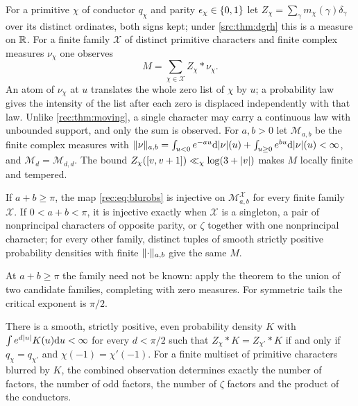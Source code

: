 For a primitive $\chi$ of conductor $q_\chi$ and parity $\epsilon_\chi\in\{0,1\}$ let $Z_\chi=\sum_\gamma m_\chi(\gamma)\delta_\gamma$ over its distinct
ordinates, both signs kept; under \cref{src:thm:dgrh} this is a measure on $\mathbb{R}$. For a finite family $\mathcal X$ of
distinct primitive characters and finite complex measures $\nu_\chi$ one observes
\begin{equation}\label{rec:eq:blurobs}
 M=\sum_{\chi\in\mathcal X}Z_\chi*\nu_\chi .
\end{equation}
An atom of $\nu_\chi$ at $u$ translates the whole zero list of $\chi$ by $u$; a probability law gives the intensity of the
list after each zero is displaced independently with that law. Unlike \cref{rec:thm:moving}, a single
character may carry a continuous law with unbounded support, and only the sum is observed. For $a,b>0$ let
$\mathcal M_{a,b}$ be the finite complex measures with
$\lVert\nu\rVert_{a,b}=\int_{u<0}e^{-au}\mathrm{d}\lvert\nu\rvert(u)+\int_{u\ge0}e^{bu}\mathrm{d}\lvert\nu\rvert(u)<\infty$, and $\mathcal M_d=\mathcal M_{d,d}$. The bound
$Z_\chi([v,v+1])\ll_\chi\log(3+\lvert v\rvert)$ \cite{BennettMartinOBryantRechnitzer2021Counting} makes $M$ locally finite and tempered.

\begin{theorem}\label{rec:thm:blur}
If $a+b\ge\pi$, the map \eqref{rec:eq:blurobs} is injective on $\mathcal M_{a,b}^{\mathcal X}$ for every finite family $\mathcal X$. If $0<a+b<\pi$, it
is injective exactly when $\mathcal X$ is a singleton, a pair of nonprincipal characters of opposite parity, or $\zeta$
together with one nonprincipal character; for every other family, distinct tuples of smooth strictly
positive probability densities with finite $\lVert\cdot\rVert_{a,b}$ give the same $M$.
\end{theorem}

At $a+b\ge\pi$ the family need not be known: apply the theorem to the union of two candidate families,
completing with zero measures. For symmetric tails the critical exponent is $\pi/2$.

\begin{theorem}\label{rec:thm:blurlaw}
There is a smooth, strictly positive, even probability density $K$ with $\int e^{d\lvert u\rvert}K(u)\mathrm{d} u<\infty$ for every
$d<\pi/2$ such that $Z_\chi*K=Z_{\chi'}*K$ if and only if $q_\chi=q_{\chi'}$ and $\chi(-1)=\chi'(-1)$. For a finite multiset of primitive
characters blurred by $K$, the combined observation determines exactly the number of factors, the number
of odd factors, the number of $\zeta$ factors and the product of the conductors.
\end{theorem}

